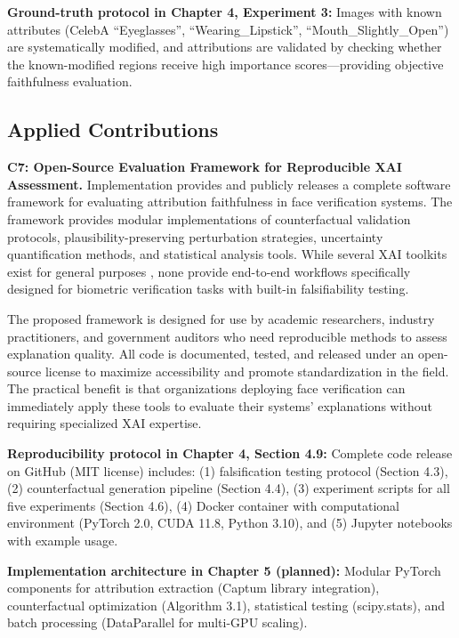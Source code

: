 \vspace{0.3cm}
\noindent\textbf{Ground-truth protocol in Chapter 4, Experiment 3:} Images with known attributes (CelebA ``Eyeglasses'', ``Wearing\_Lipstick'', ``Mouth\_Slightly\_Open'') are systematically modified, and attributions are validated by checking whether the known-modified regions receive high importance scores---providing objective faithfulness evaluation.

\subsection{Applied Contributions}

\textbf{C7: Open-Source Evaluation Framework for Reproducible XAI Assessment.} Implementation provides and publicly releases a complete software framework for evaluating attribution faithfulness in face verification systems. The framework provides modular implementations of counterfactual validation protocols, plausibility-preserving perturbation strategies, uncertainty quantification methods, and statistical analysis tools. While several XAI toolkits exist for general purposes \cite{kokhlikyan2020captum,lundberg2017unified}, none provide end-to-end workflows specifically designed for biometric verification tasks with built-in falsifiability testing.

The proposed framework is designed for use by academic researchers, industry practitioners, and government auditors who need reproducible methods to assess explanation quality. All code is documented, tested, and released under an open-source license to maximize accessibility and promote standardization in the field. The practical benefit is that organizations deploying face verification can immediately apply these tools to evaluate their systems' explanations without requiring specialized XAI expertise.

\vspace{0.3cm}
\noindent\textbf{Reproducibility protocol in Chapter 4, Section 4.9:} Complete code release on GitHub (MIT license) includes: (1) falsification testing protocol (Section 4.3), (2) counterfactual generation pipeline (Section 4.4), (3) experiment scripts for all five experiments (Section 4.6), (4) Docker container with computational environment (PyTorch 2.0, CUDA 11.8, Python 3.10), and (5) Jupyter notebooks with example usage.

\vspace{0.3cm}
\noindent\textbf{Implementation architecture in Chapter 5 (planned):} Modular PyTorch components for attribution extraction (Captum library integration), counterfactual optimization (Algorithm 3.1), statistical testing (scipy.stats), and batch processing (DataParallel for multi-GPU scaling).

